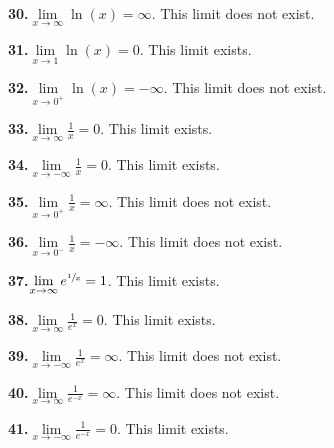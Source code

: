 \documentclass[10pt,oneside,]{book}
\theoremstyle{plain}
\theoremstyle{definition}
\numberwithin{equation}{section}
\newcommand{\fe}[2]{#1\mathopen{}\left(#2\right)\mathclose{}}
\begin{document}
\par\smallskip
\noindent\textbf{30.}\quad{}\(\lim\limits_{x\to\infty}\fe{\ln}{x}=\infty\). This limit does not exist.%
\par\smallskip
\noindent\textbf{31.}\quad{}\(\lim\limits_{x\to1}\fe{\ln}{x}=0\). This limit exists.%
\par\smallskip
\noindent\textbf{32.}\quad{}\(\lim\limits_{x\to0^{+}}\fe{\ln}{x}=-\infty\). This limit does not exist.%
\par\smallskip
\noindent\textbf{33.}\quad{}\(\lim\limits_{x\to\infty}\frac{1}{x}=0\). This limit exists.%
\par\smallskip
\noindent\textbf{34.}\quad{}\(\lim\limits_{x\to-\infty}\frac{1}{x}=0\). This limit exists.%
\par\smallskip
\noindent\textbf{35.}\quad{}\(\lim\limits_{x\to0^{+}}\frac{1}{x}=\infty\). This limit does not exist.%
\par\smallskip
\noindent\textbf{36.}\quad{}\(\lim\limits_{x\to0^{-}}\frac{1}{x}=-\infty\). This limit does not exist.%
\par\smallskip
\noindent\textbf{37.}\quad{}\(\lim\limits_{x\to\infty}e^{\sfrac{1}{x}}=1\). This limit exists.%
\par\smallskip
\noindent\textbf{38.}\quad{}\(\lim\limits_{x\to\infty}\frac{1}{e^x}=0\). This limit exists.%
\par\smallskip
\noindent\textbf{39.}\quad{}\(\lim\limits_{x\to-\infty}\frac{1}{e^x}=\infty\). This limit does not exist.%
\par\smallskip
\noindent\textbf{40.}\quad{}\(\lim\limits_{x\to\infty}\frac{1}{e^{-x}}=\infty\). This limit does not exist.%
\par\smallskip
\noindent\textbf{41.}\quad{}\(\lim\limits_{x\to-\infty}\frac{1}{e^{-x}}=0\). This limit exists.%
\par\smallskip
\end{document}
